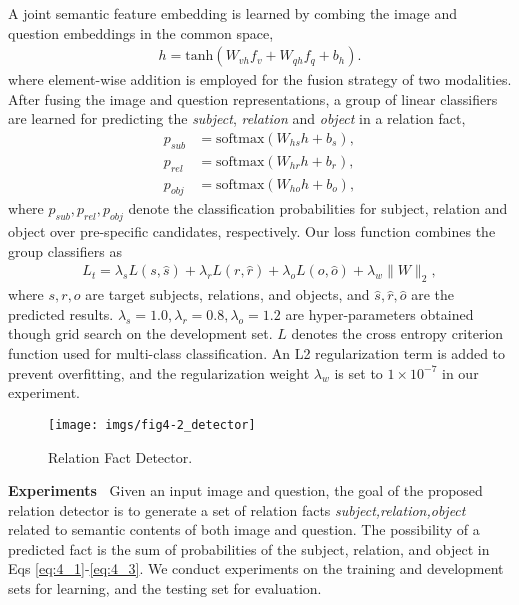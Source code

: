 \documentclass[sigconf]{acmart}
\begin{document}
A joint semantic feature embedding is learned by combing the image and question embeddings in the common space,
\begin{align}
	h =\mathrm{tanh}(W_{vh}f_v+W_{qh}f_q+b_h) . 
\end{align}
where element-wise addition is employed for the fusion strategy of two modalities. After fusing the image and question representations, a group of linear classifiers are learned for predicting the \textit{subject}, \textit{relation} and \textit{object} in a relation fact,  
\begin{align}
	p_{sub} &= \mathrm{softmax}(W_{hs} h+b_s), \label{eq:4_1} \\
	p_{rel} &= \mathrm{softmax}(W_{hr} h+b_r), \label{eq:4_2} \\
	p_{obj} &= \mathrm{softmax}(W_{ho} h+b_o), \label{eq:4_3} 
\end{align}
where $ p_{sub}, p_{rel}, p_{obj}$ denote the classification probabilities for subject, relation and  object over pre-specific candidates, respectively. Our loss function combines the group classifiers as
\begin{align}
L_{t} = \lambda_s L(s,\hat{s}) + \lambda_r L(r,\hat{r}) +\lambda_o L(o,\hat{o}) + \lambda_w \|W\| _2,
\end{align}
where $ s, r, o $ are target subjects, relations, and objects, and $ \hat{s}, \hat{r},\hat{o} $ are the predicted results. $\lambda_s=1.0, \lambda_r=0.8, \lambda_o=1.2$ are hyper-parameters obtained though grid search on the development set.
$L$ denotes the cross entropy criterion function used for multi-class classification. An L2 regularization term is added to prevent overfitting, and the regularization weight $\lambda_w$ is set to $1\times10^{-7}$ in our experiment.

\begin{figure}[t]
	\centering
	\texttt{[image: imgs/fig4-2\_detector]}
	\caption{Relation Fact Detector.}
	\label{detector}
\end{figure}




\textbf{Experiments~} Given an input image and question, the goal of the proposed relation detector is to generate a set of relation facts
\textit{subject,relation,object} related to semantic contents of both image and question. The possibility of a predicted fact is
the sum of probabilities of the subject, relation, and object in Eqs \ref{eq:4_1}-\ref{eq:4_3}.
We conduct experiments on the training and development sets for learning, and the testing set for evaluation. 
\end{document}
